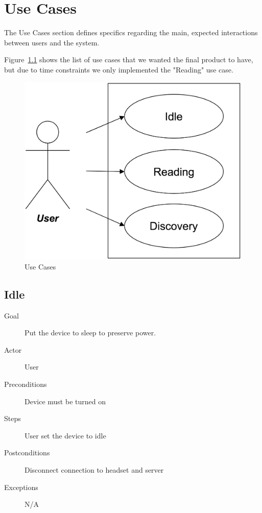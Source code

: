 \chapter{Use Cases}
The Use Cases section defines specifics regarding the main, expected interactions between users and the system.

Figure~\ref{useCase} shows the list of use cases that we wanted the final product to have, but due to time constraints we only implemented the "Reading" use case.

\begin{figure}
	
	\centering
	\includegraphics[scale = 0.15]{useCase.png}
    
    \caption{Use Cases}
    \label{useCase}
\end{figure}

\pagebreak

\section{Idle}
\begin{description}
\item [Goal] Put the device to sleep to preserve power.
\item [Actor] User
\item [Preconditions] Device must be turned on
\item [Steps] User set the device to idle
\item [Postconditions] Disconnect connection to headset and server
\item [Exceptions] N/A
\end{description}


